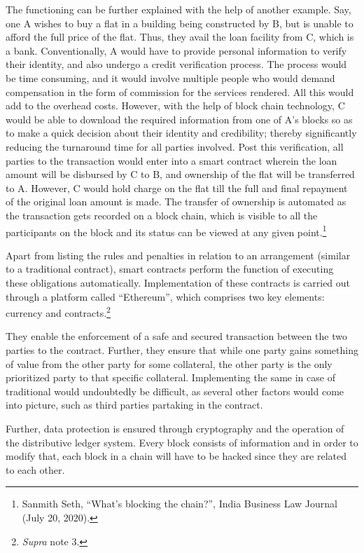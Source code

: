 \begin{multicols}{2}
\noi
The functioning can be further explained with the help of another example. Say, one A
wishes to buy a flat in a building being constructed by B, but is unable to afford the full price
of the flat. Thus, they avail the loan facility from C, which is a bank. Conventionally, A
would have to provide personal information to verify their identity, and also undergo a credit
verification process. The process would be time consuming, and it would involve multiple
people who would demand compensation in the form of commission for the services
rendered. All this would add to the overhead costs. However, with the help of block chain
technology, C would be able to download the required information from one of A’s blocks so
as to make a quick decision about their identity and credibility; thereby significantly reducing
the turnaround time for all parties involved. Post this verification, all parties to the transaction
would enter into a smart contract wherein the loan amount will be disbursed by C to B, and
ownership of the flat will be transferred to A. However, C would hold charge on the flat till
the full and final repayment of the original loan amount is made. The transfer of ownership is
automated as the transaction gets recorded on a block chain, which is visible to all the
participants on the block and its status can be viewed at any given point.\footnote{Sanmith Seth, “What’s blocking the chain?”, India Business Law Journal (July 20, 2020).}

\noi
Apart from listing the rules and penalties in relation to an arrangement (similar to a
traditional contract), smart contracts perform the function of executing these obligations
automatically. Implementation of these contracts is carried out through a platform called
“Ethereum”, which comprises two key elements: currency and contracts.\footnote{\textit{Supra} note 3.}


\noi
They enable the enforcement of a safe and secured transaction between the two parties to the
contract. Further, they ensure that while one party gains something of value from the other
party for some collateral, the other party is the only prioritized party to that specific collateral. Implementing the same in case of traditional would undoubtedly be difficult, as
several other factors would come into picture, such as third parties partaking in the contract. 

\noi
Further, data protection is ensured through cryptography and the operation of the distributive
ledger system. Every block consists of information and in order to modify that, each block in
a chain will have to be hacked since they are related to each other.


\end{multicols}
